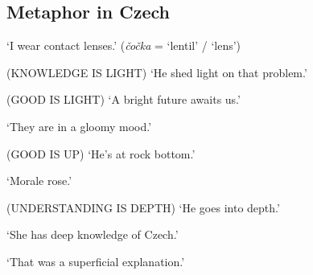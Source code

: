 \documentclass[a4paper]{article}
\begin{document}
\subsection*{Metaphor in Czech}
\begin{exe}
  \ex {}
      \trans `I wear contact lenses.'
      \hfill (\textit{čočka} = `lentil' / `lens')
\end{exe}
\begin{exe}

  \ex {} \hfill (KNOWLEDGE IS LIGHT)
      \trans `He shed light on that problem.'



  \ex {}  \hfill (GOOD IS LIGHT)
      \trans `A bright future awaits us.'

  \ex {}
      \trans `They are in a gloomy mood.'


  \ex {}  \hfill (GOOD IS UP)
      \trans `He's at rock bottom.'



  \ex {}
      \trans `Morale rose.'


  \ex {}  \hfill (UNDERSTANDING IS DEPTH)
      \trans `He goes into depth.'

  \ex {}
      \trans `She has deep knowledge of Czech.'

  \ex {}
      \trans `That was a superficial explanation.'
\end{exe}
\end{document}
